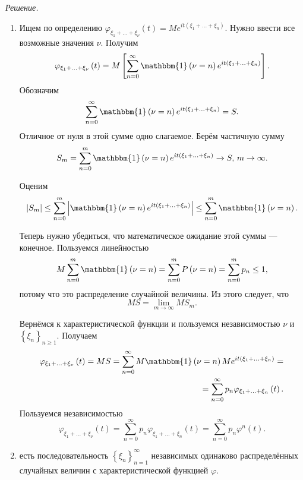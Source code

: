 \textit{Решение.}
\begin{enumerate}[label=\alph*)]
\item
Ищем по определению
$ \varphi_{ \xi_1 + \dotsc + \xi_{ \nu }} \left( t \right) =
  Me^{it \left( \xi_1 + \dotsc + \xi_n \right) }$.
Нужно ввести все возможные значения $ \nu $.
Получим
$$ \varphi_{ \xi_1 + \dotsc + \xi_{ \nu }} \left( t \right) =
  M \left[
    \sum \limits_{n=0}^{ \infty }
      \mathbbm{1} \left( \nu = n \right) e^{it \left( \xi_1 + \dotsc + \xi_n \right) }
  \right].$$
Обозначим
$$ \sum \limits_{n=0}^{ \infty }
    \mathbbm{1} \left( \nu = n \right) e^{it \left( \xi_1 + \dotsc + \xi_n \right) } =
  S.$$
Отличное от нуля в этой сумме одно слагаемое.
Берём частичную сумму
$$S_m =
  \sum \limits_{n=0}^m \mathbbm{1}
    \left( \nu = n \right) e^{it \left( \xi_1 + \dotsc + \xi_n \right) } \rightarrow
  S, \,
  m \rightarrow \infty.$$

Оценим
$$ \left| S_m \right| \leq
  \sum \limits_{n=0}^m
  \left|
    \mathbbm{1} \left( \nu = n \right) e^{it \left( \xi_1 + \dotsc + \xi_n \right) }
  \right| \leq
  \sum \limits_{n=0}^m \mathbbm{1} \left( \nu = n \right).$$

Теперь нужно убедиться, что математическое ожидание этой суммы --- конечное.
Пользуемся линейностью
$$M \sum \limits_{n=0}^m \mathbbm{1} \left( \nu = n \right) =
  \sum \limits_{n=0}^m P \left( \nu = n \right) =
  \sum \limits_{n=0}^m p_n \leq
  1,$$
потому что это распределение случайной величины.
Из этого следует, что
$$MS =
  \lim \limits_{m \to \infty } MS_m.$$

Вернёмся к характеристической функции и пользуемся независимостью
$ \nu $ и $ \left\{ \xi_n \right\}_{n \geq 1}$.
Получаем
\begin{equation*}
\begin{split}
\varphi_{ \xi_1 + \dotsc + \xi_{ \nu }} \left( t \right) =
  MS =
  \sum \limits_{n=0}^{ \infty }
    M \mathbbm{1} \left( \nu = n \right) Me^{it \left( \xi_1 + \dotsc + \xi_n \right) } = \\
  = \sum \limits_{n=0}^{ \infty } p_n \varphi_{ \xi_1 + \dotsc + \xi_n} \left( t \right).
\end{split}
\end{equation*}
Пользуемся независимостью
$$ \varphi_{ \xi_1 + \dotsc + \xi_{ \nu }} \left( t \right) =
  \sum \limits_{n=0}^{ \infty } p_n \varphi_{ \xi_1 + \dotsc + \xi_n} \left( t \right) =
  \sum \limits_{n=0}^{ \infty } p_n \varphi^n \left( t \right).$$
\item есть последовательность $ \left\{ \xi_n \right\}_{n = 1}^{ \infty }$
независимых одинаково распределённых случайных величин с характеристической функцией $ \varphi $.


\end{enumerate}
